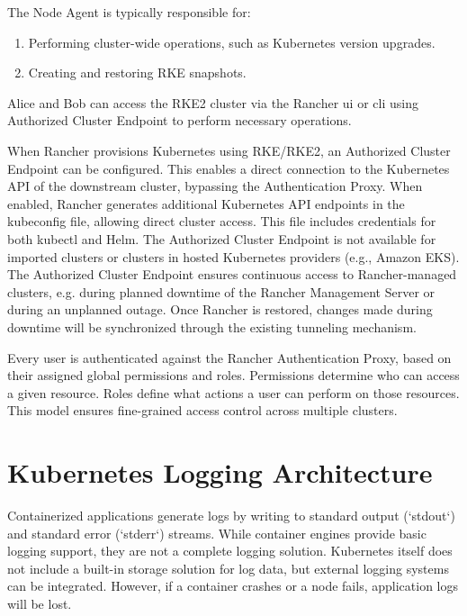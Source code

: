 \documentclass[../main.tex]{subfiles}
\begin{document}
The Node Agent is typically responsible for:

\begin{enumerate}
    \item Performing cluster-wide operations, such as Kubernetes version upgrades.
    \item Creating and restoring RKE snapshots. 
\end{enumerate}
Alice and Bob can access the RKE2 cluster via the Rancher \gls{ui} or \gls{cli} using Authorized Cluster Endpoint to perform necessary operations.  

When Rancher provisions Kubernetes using RKE/RKE2, an Authorized Cluster Endpoint can be configured. This enables a direct connection to the Kubernetes API of the downstream cluster, bypassing the Authentication Proxy. When enabled, Rancher generates additional Kubernetes API endpoints in the kubeconfig file, allowing direct cluster access. This file includes credentials for both kubectl and Helm. The Authorized Cluster Endpoint is not available for imported clusters or clusters in hosted Kubernetes providers (e.g., Amazon EKS).
The Authorized Cluster Endpoint ensures continuous access to Rancher-managed clusters, e.g. during planned downtime of the Rancher Management Server or during an unplanned outage. Once Rancher is restored, changes made during downtime will be synchronized through the existing tunneling mechanism.

Every user is authenticated against the Rancher Authentication Proxy, based on their assigned global permissions and roles. Permissions determine who can access a given resource. Roles define what actions a user can perform on those resources. This model ensures fine-grained access control across multiple clusters. \cite{rancherbasics}

\section{Kubernetes Logging Architecture}

Containerized applications generate logs by writing to standard output (`stdout`) and standard error (`stderr`) streams. While container engines provide basic logging support, they are not a complete logging solution. Kubernetes itself does not include a built-in storage solution for log data, but external logging systems can be integrated. However, if a container crashes or a node fails, application logs will be lost. \cite{loggingkubernetes}
\end{document}
